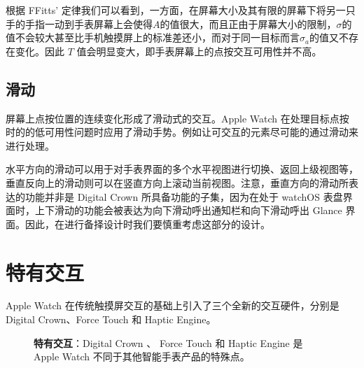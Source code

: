 根据 FFitts' 定律我们可以看到，一方面，在屏幕大小及其有限的屏幕下将另一只手的手指一动到手表屏幕上会使得$A$的值很大，而且正由于屏幕大小的限制，$\sigma$的值不会较大甚至比手机触摸屏上的标准差还小，而对于同一目标而言$\sigma_a$的值又不存在变化。因此 $T$ 值会明显变大，即手表屏幕上的点按交互可用性并不高。

\subsection{滑动}

屏幕上点按位置的连续变化形成了滑动式的交互。Apple Watch 在处理目标点按时的的低可用性问题时应用了滑动手势。例如让可交互的元素尽可能的通过滑动来进行处理。

水平方向的滑动可以用于对手表界面的多个水平视图进行切换、返回上级视图等，垂直反向上的滑动则可以在竖直方向上滚动当前视图。注意，垂直方向的滑动所表达的功能并非是 Digital Crown 所具备功能的子集，因为在处于 watchOS 表盘界面时，上下滑动的功能会被表达为向下滑动呼出通知栏和向下滑动呼出 Glance 界面。因此，在进行备择设计时我们要慎重考虑这部分的设计。

\section{特有交互}

Apple Watch 在传统触摸屏交互的基础上引入了三个全新的交互硬件，分别是Digital Crown、Force Touch 和 Haptic Engine。

\begin{figure}[H]
\centering
{}
\caption{\textbf{特有交互}：Digital Crown 、 Force Touch 和 Haptic Engine 是 Apple Watch 不同于其他智能手表产品的特殊点。}
\label{fig:special}
\end{figure}

